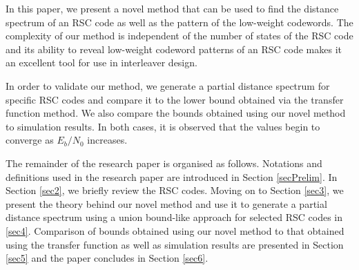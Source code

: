 In this paper, we present a novel method that can be used to find the distance spectrum of an RSC code as well as the pattern of the low-weight codewords. The complexity of our method is independent of the number of states of the RSC code and its ability to reveal low-weight codeword patterns of an RSC code makes it an excellent tool for use in interleaver design.

In order to validate our method, we generate a partial distance spectrum for specific RSC codes and compare it to the lower bound obtained via the transfer function method. We also compare the bounds obtained using our novel method to simulation results. In both cases, it is observed that the values begin to converge as $E_b/N_0$ increases.

The remainder of the research paper is organised as follows. Notations and definitions used in the research paper are introduced in Section \ref{secPrelim}. In Section \ref{sec2}, we briefly review the RSC codes. Moving on to Section \ref{sec3}, we present the theory behind our novel method and use it to generate a partial distance spectrum using a union bound-like approach for selected RSC codes in \ref{sec4}. Comparison of bounds obtained using our novel method to that obtained using the transfer function as well as  simulation results are presented in Section \ref{sec5} and the paper concludes in Section \ref{sec6}.
